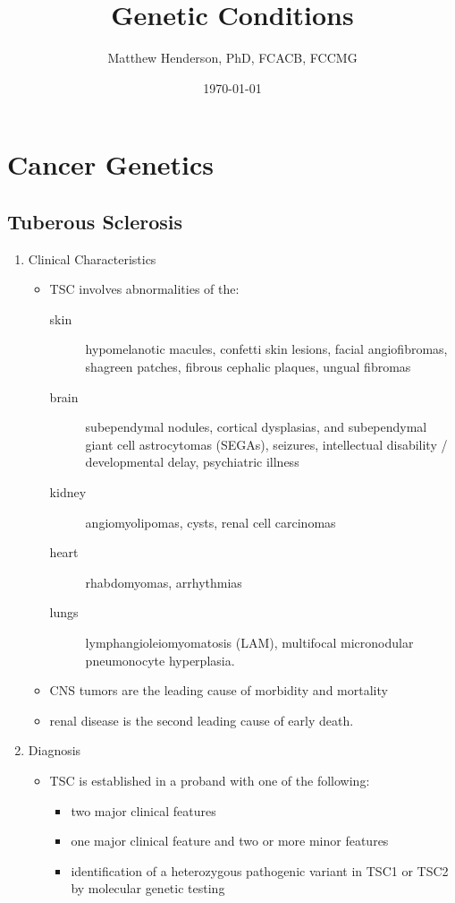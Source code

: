\documentclass[12pt]{scrartcl}
\author{Matthew Henderson, PhD, FCACB, FCCMG}
\date{\today}
\title{Genetic Conditions}
\begin{document}
\maketitle
\setcounter{tocdepth}{2}
\tableofcontents


\section{Cancer Genetics}
\label{sec:org2887a83}
\subsection{Tuberous Sclerosis}
\label{sec:org76a9d67}
\begin{enumerate}
\item Clinical Characteristics
\label{sec:org04671e5}
\begin{itemize}
\item TSC involves abnormalities of the:
\begin{description}
\item[{skin}] hypomelanotic macules, confetti skin lesions, facial
angiofibromas, shagreen patches, fibrous cephalic plaques,
ungual fibromas
\item[{brain}] subependymal nodules, cortical dysplasias, and
subependymal giant cell astrocytomas (SEGAs), seizures,
intellectual disability / developmental delay,
psychiatric illness
\item[{kidney}] angiomyolipomas, cysts, renal cell carcinomas
\item[{heart}] rhabdomyomas, arrhythmias
\item[{lungs}] lymphangioleiomyomatosis (LAM), multifocal micronodular
pneumonocyte hyperplasia.
\end{description}
\item CNS tumors are the leading cause of morbidity and mortality
\item renal disease is the second leading cause of early death.
\end{itemize}

\item Diagnosis
\label{sec:org8019044}
\begin{itemize}
\item TSC is established in a proband with one of the following:
\begin{itemize}
\item two major clinical features
\item one major clinical feature and two or more minor features
\item identification of a heterozygous pathogenic variant in TSC1 or
TSC2 by molecular genetic testing
\end{itemize}
\end{itemize}


\end{enumerate}
\end{document}
